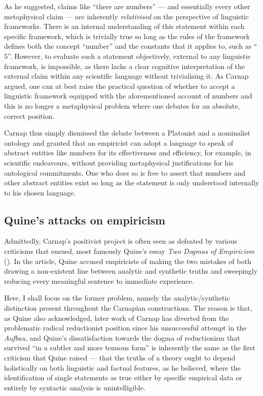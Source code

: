 \documentclass[12pt]{article}
\theoremstyle{plain}
\theoremstyle{definition}
\begin{document}
As he suggested, claims like ``there are numbers'' --- and essentially every other metaphysical claim --- are inherently \emph{relativised} on the perspective of linguistic frameworks. There is an internal understanding of this statement within each specific framework, which is trivially true so long as the rules of the framework defines both the concept ``number'' and the constants that it applies to, such as ``$5$''. However, to evaluate such a statement objectively, external to any linguistic framework, is impossible, as there lacks a clear cognitive interpretation of the external claim within any scientific language without trivialising it. As Carnap argued, one can at best raise the practical question of whether to accept a linguistic framework equipped with the aforementioned account of numbers and this is no longer a metaphysical problem where one debates for an absolute, correct position.

Carnap thus simply dismissed the debate between a Platonist and a nominalist ontology and granted that an empiricist can adopt a language to speak of abstract entities like numbers for its effectiveness and efficiency, for example, in scientific endeavours, without providing metaphysical justifications for his ontological commitments. One who does so is free to assert that numbers and other abstract entities exist so long as the statement is only understood internally to his chosen language.

\subsection{Quine's attacks on empiricism}

Admittedly, Carnap's positivist project is often seen as defeated by various criticisms that ensued, most famously Quine's essay \emph{Two Dogmas of Empiricism} (\cite{two-dogmas}). In the article, Quine accused empiricists of making the two mistakes of both drawing a non-existent line between analytic and synthetic truths and sweepingly reducing every meaningful sentence to immediate experience.

Here, I shall focus on the former problem, namely the analytic/synthetic distinction present throughout the Carnapian constructions. The reason is that, as Quine also acknowledged, later work of Carnap has diverted from the problematic radical reductionist position since his unsuccessful attempt in the \emph{Aufbau}, and Quine's dissatisfaction towards the dogma of reductionism that survived ``in a subtler and more tenuous form'' is inherently the same as the first criticism that Quine raised --- that the truths of a theory ought to depend holistically on both linguistic and factual features, as he believed, where the identification of single statements as true either by specific empirical data or entirely by syntactic analysis is unintelligible.
\end{document}
